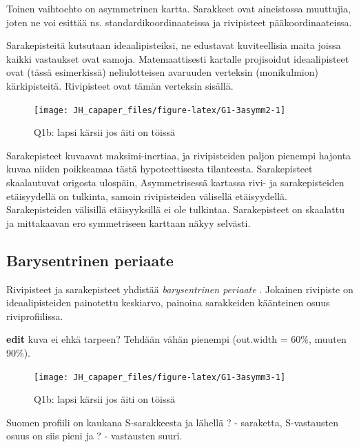 \documentclass[
  finnish,
]{book}
\begin{document}
Toinen vaihtoehto on asymmetrinen kartta. Sarakkeet ovat aineistossa muuttujia,
joten ne voi esittää ns. standardikoordinaateissa ja rivipisteet pääkoordinaateissa.

Sarakepisteitä kutsutaan ideaalipisteiksi, ne edustavat kuviteellisia maita joissa
kaikki vastaukset ovat samoja. Matemaattisesti kartalle projisoidut ideaalipisteet
ovat (tässä esimerkissä) neliulotteisen avaruuden verteksin (monikulmion)
kärkipisteitä. Rivipisteet ovat tämän verteksin sisällä.

\begin{figure}

{\centering \texttt{[image: JH\_capaper\_files/figure-latex/G1-3asymm2-1]} 

}

\caption{Q1b: lapsi kärsii jos äiti on töissä}\label{fig:G1-3asymm2}
\end{figure}

Sarakepisteet kuvaavat maksimi-inertiaa, ja rivipisteiden paljon pienempi hajonta
kuvaa niiden poikkeamaa tästä hypoteettisesta tilanteesta. Sarakepisteet
skaalautuvat origosta ulospäin, Asymmetrisessä kartassa rivi- ja sarakepisteiden
etäisyydellä on tulkinta, samoin rivipisteiden välisellä etäisyydellä.
Sarakepisteiden välisillä etäisyyksillä ei ole tulkintaa. Sarakepisteet on
skaalattu ja mittakaavan ero symmetriseen karttaan näkyy selvästi.

\hypertarget{barysentrinen-periaate}{%
\subsection{Barysentrinen periaate}\label{barysentrinen-periaate}}

Rivipisteet ja sarakepisteet yhdistää \emph{barysentrinen periaate} . Jokainen rivipiste
on ideaalipisteiden painotettu keskiarvo, painoina sarakkeiden käänteinen osuus
riviprofiilissa.

\textbf{edit} kuva ei ehkä tarpeen? Tehdään vähän pienempi (out.width = 60\%, muuten 90\%).

\begin{figure}

{\centering \texttt{[image: JH\_capaper\_files/figure-latex/G1-3asymm3-1]} 

}

\caption{Q1b: lapsi kärsii jos äiti on töissä}\label{fig:G1-3asymm3}
\end{figure}

Suomen profiili on kaukana S-sarakkeesta ja lähellä ? - saraketta, S-vastausten
osuus on siis pieni ja ? - vastausten suuri.
\end{document}
